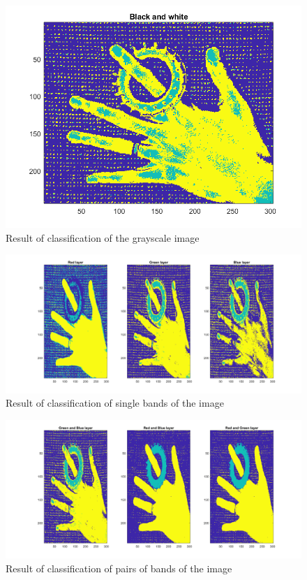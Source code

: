 \documentclass[12pt]{article}
\begin{document}
\begin{figure}[h!]
  \centering
  \includegraphics[width = 15cm]{images/Q4_bw.png}
  \caption{Result of classification of the grayscale image}
  \label{fig:Q4_bw}
\end{figure}

\begin{figure}[h!]
  \centering
  \includegraphics[width = 15cm]{images/Q4_1b.png}
  \caption{Result of classification of single bands of the image}
  \label{fig:Q4_1}
\end{figure}

\begin{figure}[h!]
  \centering
  \includegraphics[width = 15cm]{images/Q4_2b.png}
  \caption{Result of classification of pairs of bands of the image}
  \label{fig:Q4_2}
\end{figure}
\end{document}

